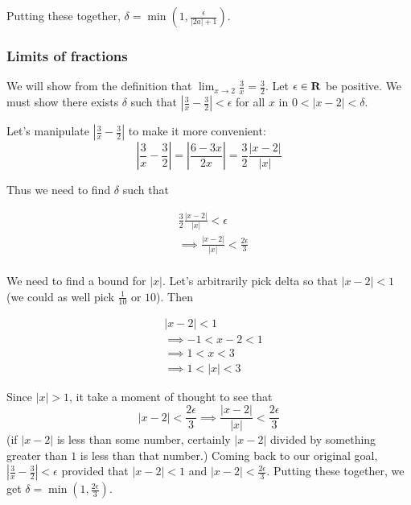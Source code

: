 Putting these together, $\delta=\min(1, \frac{\epsilon}{|2a|+1})$.

\subsubsection*{Limits of fractions}

We will show from the definition that
$\lim_{x\to 2}\frac{3}{x}=\frac{3}{2}$. Let $\epsilon\in\mathbf{R}$ be positive. We must
show there exists $\delta$ such that
$|\frac{3}{x}-\frac{3}{2}|<\epsilon$ for all $x$ in $0<|x-2|<\delta$.

\vs

Let's manipulate $|\frac{3}{x}-\frac{3}{2}|$ to make it more convenient:
\[\left|\frac{3}{x}-\frac{3}{2}\right|=\left|\frac{6-3x}{2x}\right|=\frac{3}{2}\frac{|x-2|}{|x|}\]

Thus we need to find $\delta$ such that

\begin{align*}
&\frac{3}{2}\frac{|x-2|}{|x|}<\epsilon\\
&\implies \frac{|x-2|}{|x|}<\frac{2\epsilon}{3}\\
\end{align*}

We need to find a bound for $|x|$. Let's arbitrarily pick delta so
that $|x-2|<1$ (we could as well pick $\frac{1}{10}$ or $10$). Then

\begin{align*}
    &|x-2|<1\\
    &\implies -1<x-2<1\\
    &\implies 1<x<3\\
    &\implies 1<|x|<3
\end{align*}

Since $|x|>1$, it take a moment of thought to see that
\[|x-2|<\frac{2\epsilon}{3}\implies\frac{|x-2|}{|x|}<\frac{2\epsilon}{3}\]
(if $|x-2|$ is less than some number, certainly $|x-2|$ divided by something greater than $1$ is less than that number.) Coming back to our original goal, $|\frac{3}{x}-\frac{3}{2}|<\epsilon$ provided that $|x-2|<1$ and $|x-2|<\frac{2\epsilon}{3}$. Putting these together, we get $\delta=\min(1, \frac{2\epsilon}{3})$.

